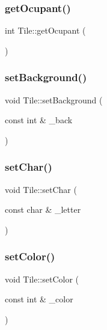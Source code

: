 \mbox{\label{class_tile_a099498fe5e6da58cb180402ab0a80e33}} 
\subsubsection{\texorpdfstring{get\+Ocupant()}{getOcupant()}}
{\footnotesize\ttfamily int Tile\+::get\+Ocupant (\begin{DoxyParamCaption}{ }\end{DoxyParamCaption})\hspace{0.3cm}{\ttfamily [inline]}}

\mbox{\label{class_tile_a423abf0e144241f75ea6d66b958b7a01}} 
\subsubsection{\texorpdfstring{set\+Background()}{setBackground()}}
{\footnotesize\ttfamily void Tile\+::set\+Background (\begin{DoxyParamCaption}\item[{const int \&}]{\+\_\+back }\end{DoxyParamCaption})\hspace{0.3cm}{\ttfamily [inline]}}

\mbox{\label{class_tile_afc534065ecec958c479461e352785827}} 
\subsubsection{\texorpdfstring{set\+Char()}{setChar()}}
{\footnotesize\ttfamily void Tile\+::set\+Char (\begin{DoxyParamCaption}\item[{const char \&}]{\+\_\+letter }\end{DoxyParamCaption})\hspace{0.3cm}{\ttfamily [inline]}}

\mbox{\label{class_tile_a86242124a0890595d0f523060de4ea76}} 
\subsubsection{\texorpdfstring{set\+Color()}{setColor()}}
{\footnotesize\ttfamily void Tile\+::set\+Color (\begin{DoxyParamCaption}\item[{const int \&}]{\+\_\+color }\end{DoxyParamCaption})\hspace{0.3cm}{\ttfamily [inline]}}

